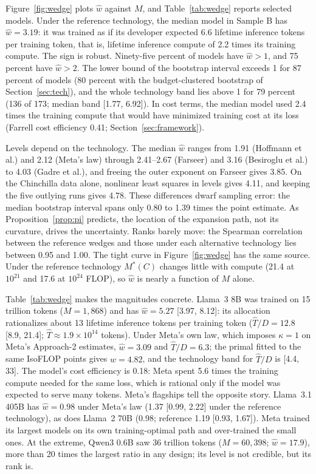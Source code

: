 Figure~\ref{fig:wedge} plots $\hat w$ against $M$, and Table~\ref{tab:wedge} reports selected models. Under the
reference technology, the median model in Sample B has $\hat w=3.19$: it was trained as if its developer expected 6.6
lifetime inference tokens per training token, that is, lifetime inference compute of 2.2 times its training compute.
The sign is robust. Ninety-five percent of models have $\hat w>1$, and 75 percent have $\hat w>2$. The lower bound of
the bootstrap interval exceeds 1 for 87 percent of models (80 percent with the budget-clustered bootstrap of
Section~\ref{sec:tech}), and the whole technology band lies above 1 for 79 percent (136 of 173; median band [1.77,
6.92]). In cost terms, the median model used 2.4 times the training compute that would have minimized training cost at
its loss (Farrell cost efficiency 0.41; Section~\ref{sec:framework}).



Levels depend on the technology. The median $\hat w$ ranges from 1.91 (Hoffmann et al.) and 2.12 (Meta's law) through
2.41--2.67 (Farseer) and 3.16 (Besiroglu et al.) to 4.03 (Gadre et al.), and freeing the outer exponent on Farseer gives
3.85. On the Chinchilla data alone, nonlinear least squares in levels gives 4.11, and keeping the five outlying runs gives
4.78. These differences dwarf sampling error: the
median bootstrap interval spans only 0.80 to 1.39 times the point estimate. As Proposition~\ref{prop:pi} predicts, the
location of the expansion path, not its curvature, drives the uncertainty. Ranks barely move: the Spearman correlation
between the reference wedges and those under each alternative technology lies between 0.95 and 1.00. The tight curve in
Figure~\ref{fig:wedge} has the same source. Under the reference technology $M^*(C)$ changes little with compute (21.4 at
$10^{21}$ and 17.6 at $10^{24}$ FLOP), so $\hat w$ is nearly a function of $M$ alone.

Table~\ref{tab:wedge} makes the magnitudes concrete. Llama~3 8B was trained on 15 trillion tokens ($M=1{,}868$) and has
$\hat w=5.27$ [3.97, 8.12]: its allocation rationalizes about 13 lifetime inference tokens per training token ($\hat
T/D=12.8$ [8.9, 21.4]; $\hat T\approx1.9\times10^{14}$ tokens). Under Meta's own law, which imposes $\kappa=1$ on
Meta's Approach-2 estimates, $\hat w=3.09$ and $\hat T/D=6.3$; the primal fitted to the same IsoFLOP points gives
$\hat w=4.82$, and the technology band for $\hat T/D$ is [4.4, 33]. The model's cost efficiency is 0.18: Meta spent 5.6
times the training compute needed for the same loss, which is rational only if the model was expected to serve many
tokens. Meta's flagships tell the opposite story. Llama~3.1 405B has $\hat w=0.98$ under Meta's law (1.37 [0.99, 2.22]
under the reference technology), as does Llama~2 70B (0.98; reference 1.19 [0.93, 1.67]). Meta trained its largest
models on its own training-optimal path and over-trained the small ones. At the extreme, Qwen3 0.6B saw 36 trillion
tokens ($M=60{,}398$; $\hat w=17.9$), more than 20 times the largest ratio in any design; its level is not credible, but
its rank is.

